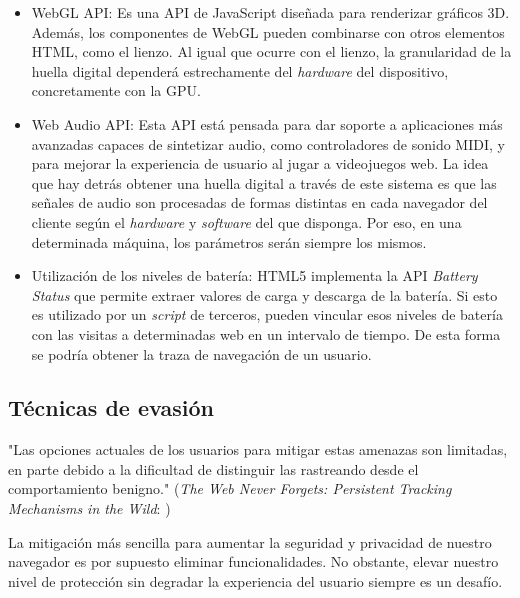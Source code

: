 \begin{itemize}
	\item WebGL API: Es una API de JavaScript diseñada para renderizar gráficos 3D. Además, los componentes de WebGL pueden combinarse con otros elementos HTML, como el lienzo\cite{canvas_paper}. Al igual que ocurre con el lienzo, la granularidad de la huella digital dependerá estrechamente del \textit{hardware} del dispositivo, concretamente con la GPU. \par 
	
	\item Web Audio API\cite{audio_w3c}: Esta API está pensada para dar soporte a aplicaciones más avanzadas capaces de sintetizar audio, como controladores de sonido MIDI, y para mejorar la experiencia de usuario al jugar a videojuegos web. La idea que hay detrás obtener una huella digital a través de este sistema es que las señales de audio son procesadas de formas distintas en cada navegador del cliente según el \textit{hardware} y \textit{software} del que disponga. Por eso, en una determinada máquina, los parámetros serán siempre los mismos. \par 
	
	\item Utilización de los niveles de batería: HTML5 implementa la API \textit{Battery Status} que permite extraer valores de carga y descarga de la batería. Si esto es utilizado por un \textit{script} de terceros, pueden vincular esos niveles de batería con las visitas a determinadas web en un intervalo de tiempo. De esta forma se podría obtener la traza de navegación de un usuario\cite{battery_paper}. \par 
	
\end{itemize}

\subsection{Técnicas de evasión}
"Las opciones actuales de los usuarios para mitigar estas amenazas son limitadas, en parte debido a la dificultad de distinguir las rastreando desde el comportamiento benigno." (\textit{The Web Never Forgets: Persistent Tracking Mechanisms in the Wild}: \cite{never_forget_paper}) \par 

La mitigación más sencilla para aumentar la seguridad y privacidad de nuestro navegador es por supuesto eliminar funcionalidades. No obstante, elevar nuestro nivel de protección sin degradar la experiencia del usuario siempre es un desafío. \par 

